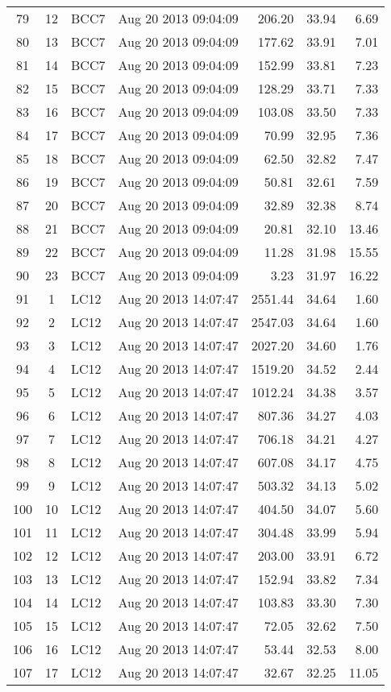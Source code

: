 \documentclass{article}
\begin{document}
\begin{longtable}{ccllrrr}
79&12&BCC7&Aug 20 2013 09:04:09&206.20&33.94&6.69\\
80&13&BCC7&Aug 20 2013 09:04:09&177.62&33.91&7.01\\
81&14&BCC7&Aug 20 2013 09:04:09&152.99&33.81&7.23\\
82&15&BCC7&Aug 20 2013 09:04:09&128.29&33.71&7.33\\
83&16&BCC7&Aug 20 2013 09:04:09&103.08&33.50&7.33\\
84&17&BCC7&Aug 20 2013 09:04:09&70.99&32.95&7.36\\
85&18&BCC7&Aug 20 2013 09:04:09&62.50&32.82&7.47\\
86&19&BCC7&Aug 20 2013 09:04:09&50.81&32.61&7.59\\
87&20&BCC7&Aug 20 2013 09:04:09&32.89&32.38&8.74\\
88&21&BCC7&Aug 20 2013 09:04:09&20.81&32.10&13.46\\
89&22&BCC7&Aug 20 2013 09:04:09&11.28&31.98&15.55\\
90&23&BCC7&Aug 20 2013 09:04:09&3.23&31.97&16.22\\
\hline 
91&1&LC12&Aug 20 2013 14:07:47&2551.44&34.64&1.60\\
92&2&LC12&Aug 20 2013 14:07:47&2547.03&34.64&1.60\\
93&3&LC12&Aug 20 2013 14:07:47&2027.20&34.60&1.76\\
94&4&LC12&Aug 20 2013 14:07:47&1519.20&34.52&2.44\\
95&5&LC12&Aug 20 2013 14:07:47&1012.24&34.38&3.57\\
96&6&LC12&Aug 20 2013 14:07:47&807.36&34.27&4.03\\
97&7&LC12&Aug 20 2013 14:07:47&706.18&34.21&4.27\\
98&8&LC12&Aug 20 2013 14:07:47&607.08&34.17&4.75\\
99&9&LC12&Aug 20 2013 14:07:47&503.32&34.13&5.02\\
100&10&LC12&Aug 20 2013 14:07:47&404.50&34.07&5.60\\
101&11&LC12&Aug 20 2013 14:07:47&304.48&33.99&5.94\\
102&12&LC12&Aug 20 2013 14:07:47&203.00&33.91&6.72\\
103&13&LC12&Aug 20 2013 14:07:47&152.94&33.82&7.34\\
104&14&LC12&Aug 20 2013 14:07:47&103.83&33.30&7.30\\
105&15&LC12&Aug 20 2013 14:07:47&72.05&32.62&7.50\\
106&16&LC12&Aug 20 2013 14:07:47&53.44&32.53&8.00\\
107&17&LC12&Aug 20 2013 14:07:47&32.67&32.25&11.05\\

\end{longtable}
\end{document}
